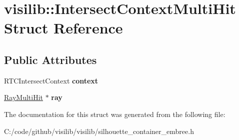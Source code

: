 \hypertarget{structvisilib_1_1_intersect_context_multi_hit}{}\section{visilib\+::Intersect\+Context\+Multi\+Hit Struct Reference}
\label{structvisilib_1_1_intersect_context_multi_hit}
\subsection*{Public Attributes}
\begin{DoxyCompactItemize}
\item 
\mbox{\label{structvisilib_1_1_intersect_context_multi_hit_afff2b3111ac044ae51e6131e38a9afaa}} 
R\+T\+C\+Intersect\+Context {\bfseries context}
\item 
\mbox{\label{structvisilib_1_1_intersect_context_multi_hit_a97b445eecd320513cd9c1bc70324ba41}} 
\mbox{\hyperlink{structvisilib_1_1_ray_multi_hit}{Ray\+Multi\+Hit}} $\ast$ {\bfseries ray}
\end{DoxyCompactItemize}


The documentation for this struct was generated from the following file\+:\begin{DoxyCompactItemize}
\item 
C\+:/code/github/visilib/visilib/silhouette\+\_\+container\+\_\+embree.\+h\end{DoxyCompactItemize}
